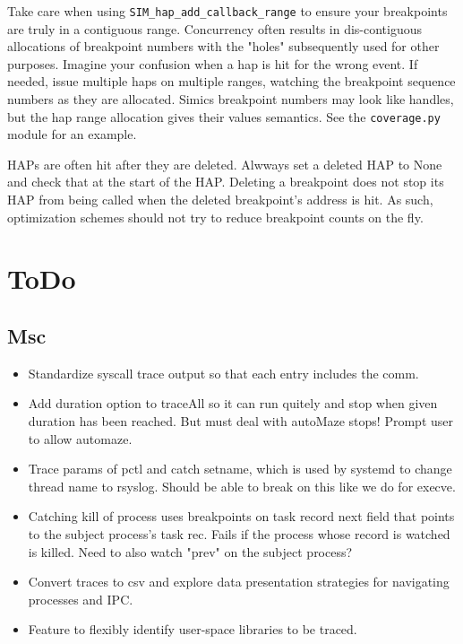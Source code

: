 \documentclass[titlepage]{article}
\begin{document}
\begin{appendices}
Take care when using {\tt SIM\_hap\_add\_callback\_range} to ensure your breakpoints are truly in a contiguous range.
Concurrency often results in dis-contiguous allocations of breakpoint numbers with the "holes" subsequently used for other purposes.
Imagine your confusion when a hap is hit for the wrong event.  If needed, issue multiple haps on multiple ranges, watching the
breakpoint sequence numbers as they are allocated.  Simics breakpoint numbers may look like handles, but the hap range allocation 
gives their values semantics.  See the {\tt coverage.py} module for an example.

HAPs are often hit after they are deleted.  Alwways set a deleted HAP to None and check that at the start of the HAP.
Deleting a breakpoint does not stop its HAP from being called when the deleted breakpoint's address is hit.  As such,
optimization schemes should not try to reduce breakpoint counts on the fly.

\section{ToDo}
\subsection {Msc}
\begin{itemize}
\item Standardize syscall trace output so that each entry includes the comm.

\item Add duration option to traceAll so it can run quitely and stop when given duration has been reached.  But must deal with
autoMaze stops!  Prompt user to allow automaze.

\item Trace params of pctl and catch setname, which is used by systemd to change thread name to rsyslog.  Should be able to 
break on this like we do for execve.

\item Catching kill of process uses breakpoints on task record next field that points to the subject process's task rec.  Fails if the
process whose record is watched is killed.  Need to also watch "prev" on the subject process?

\item Convert traces to csv and explore data presentation strategies for navigating processes and IPC.

\item Feature to flexibly identify user-space libraries to be traced.


\end{itemize}
\end{appendices}
\end{document}
